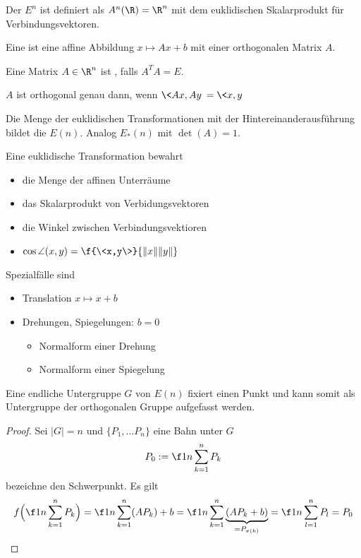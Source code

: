 \begin{df}
	Der  $E^n$ ist definiert als $A^n(\R) = \R^n$ mit dem euklidischen Skalarprodukt für Verbindungsvektoren.

	Eine  ist eine affine Abbildung $x \mapsto Ax + b$ mit einer orthogonalen Matrix $A$.
\end{df}

\begin{nt}
	Eine Matrix $A \in \R^n$ ist , falls $A^T A = E$.
	\begin{note}
		$A$ ist orthogonal genau dann, wenn $\<Ax, Ay\> = \<x,y\>$
	\end{note}
	Die Menge der euklidischen Transformationen mit der Hintereinanderausführung bildet die  $E(n)$.
	Analog $E_*(n)$ mit $\det(A) = 1$.
	\begin{note}
		Eine euklidische Transformation bewahrt
		\begin{itemize}
			\item
				die Menge der affinen Unterräume
			\item
				das Skalarprodukt von Verbidungsvektoren
			\item
				die Winkel zwischen Verbindungsvektioren
			\item
				$\cos \angle (x,y) = \f {\<x,y\>}{\|x\|\|y\|}$
		\end{itemize}
		Spezialfälle sind
		\begin{itemize}
			\item
				Translation $x \mapsto x + b$
			\item
				Drehungen, Spiegelungen: $b = 0$
				\begin{itemize}
					\item
						Normalform einer Drehung
					\item
						Normalform einer Spiegelung
				\end{itemize}
		\end{itemize}
	\end{note}
\end{nt}

\begin{lem}
	Eine endliche Untergruppe $G$ von $E(n)$ fixiert einen Punkt und kann somit als Untergruppe der orthogonalen Gruppe aufgefasst werden.
	\begin{proof}
		Sei $|G| = n$ und $\{P_1, \dotsc P_n\}$ eine Bahn unter $G$
		\[
			P_0 := \f 1n \sum_{k=1}^n P_k
		\]
		bezeichne den Schwerpunkt.
		Es gilt
		\[
			f\Big(\f 1n \sum_{k=1}^n P_k\Big)
			= \f 1n \sum_{k=1}^n (AP_k) + b
			= \f 1n \sum_{k=1}^n \underbrace{(AP_k + b)}_{=P_{\sigma(k)}}
			= \f 1n \sum_{l=1}^n P_l
			= P_0
		\]
	\end{proof}
\end{lem}


